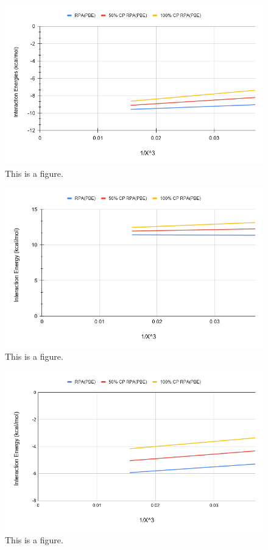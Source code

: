 \documentclass[11pt]{article}
\begin{document}
\begin{figure}
  \includegraphics[scale=0.5]{tpss_38.png}
  \caption{This is a figure.}
  \label{fig:<name>}
\end{figure}

\begin{figure}
  \includegraphics[scale=0.5]{tpssh_11.png}
  \caption{This is a figure.}
  \label{fig:<name>}
\end{figure}

\begin{figure}
  \includegraphics[scale=0.5]{tpssh_24.png}
  \caption{This is a figure.}
  \label{fig:<name>}
\end{figure}
\end{document}
